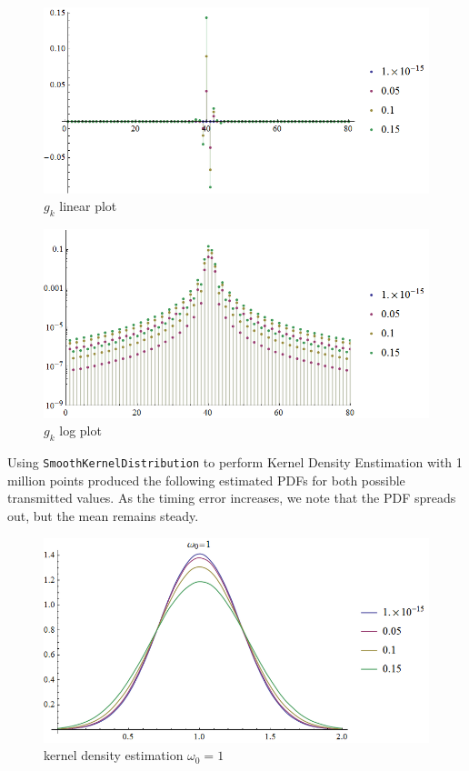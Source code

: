 \begin{figure}[htbp]
\centering
\includegraphics[width=\linewidth]{../../../plots/fyp1_w1_gklin.png}
\caption{$g_k$ linear plot}
\end{figure}

\begin{figure}[htbp]
\centering
\includegraphics[width=\linewidth]{../../../plots/fyp1_w1_gklog.png}
\caption{$g_k$ log plot}
\end{figure}

Using \texttt{SmoothKernelDistribution} to perform Kernel Density
Enstimation with 1 million points produced the following estimated PDFs
for both possible transmitted values. As the timing error increases, we
note that the PDF spreads out, but the mean remains steady.

\begin{figure}[htbp]
\centering
\includegraphics[width=\linewidth]{../../../plots/fyp1_w1_kde.png}
\caption{kernel density estimation $\omega_0=1$}
\end{figure}

